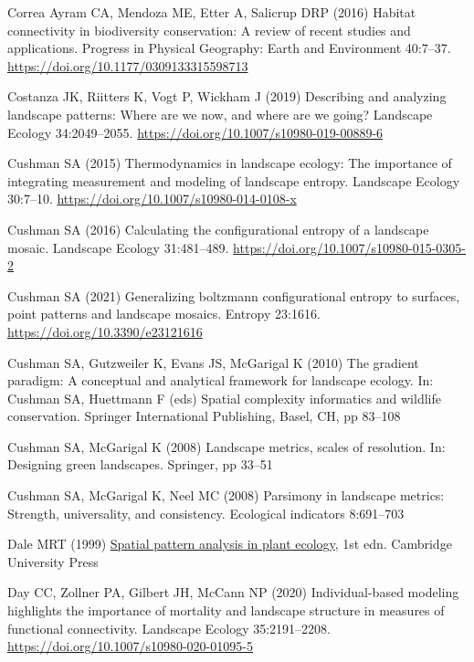 \documentclass[
  10pt,
  a4paperpaper,
]{article}
\newlength{\cslhangindent}
\newenvironment{CSLReferences}[2] %
 {\begin{list}{}{%
  \setlength{\itemindent}{0pt}
  \setlength{\leftmargin}{0pt}
  \setlength{\parsep}{0pt}
  \ifodd #1
   \setlength{\leftmargin}{\cslhangindent}
   \setlength{\itemindent}{-1\cslhangindent}
  \fi
  \setlength{\itemsep}{#2\baselineskip}}}
 {\end{list}}
\begin{document}
\begin{CSLReferences}{1}{1}
Correa Ayram CA, Mendoza ME, Etter A, Salicrup DRP (2016) Habitat
connectivity in biodiversity conservation: A review of recent studies
and applications. Progress in Physical Geography: Earth and Environment
40:7--37. \url{https://doi.org/10.1177/0309133315598713}

Costanza JK, Riitters K, Vogt P, Wickham J (2019) Describing and
analyzing landscape patterns: Where are we now, and where are we going?
Landscape Ecology 34:2049--2055.
\url{https://doi.org/10.1007/s10980-019-00889-6}

Cushman SA (2015) Thermodynamics in landscape ecology: The importance of
integrating measurement and modeling of landscape entropy. Landscape
Ecology 30:7--10. \url{https://doi.org/10.1007/s10980-014-0108-x}

Cushman SA (2016) Calculating the configurational entropy of a landscape
mosaic. Landscape Ecology 31:481--489.
\url{https://doi.org/10.1007/s10980-015-0305-2}

Cushman SA (2021) Generalizing boltzmann configurational entropy to
surfaces, point patterns and landscape mosaics. Entropy 23:1616.
\url{https://doi.org/10.3390/e23121616}

Cushman SA, Gutzweiler K, Evans JS, McGarigal K (2010) The gradient
paradigm: A conceptual and analytical framework for landscape ecology.
In: Cushman SA, Huettmann F (eds) Spatial complexity informatics and
wildlife conservation. Springer International Publishing, Basel, CH, pp
83--108

Cushman SA, McGarigal K (2008) Landscape metrics, scales of resolution.
In: Designing green landscapes. Springer, pp 33--51

Cushman SA, McGarigal K, Neel MC (2008) Parsimony in landscape metrics:
Strength, universality, and consistency. Ecological indicators
8:691--703

Dale MRT (1999) \href{https://doi.org/10.1017/CBO9780511612589}{Spatial
pattern analysis in plant ecology}, 1st edn. Cambridge University Press

Day CC, Zollner PA, Gilbert JH, McCann NP (2020) Individual-based
modeling highlights the importance of mortality and landscape structure
in measures of functional connectivity. Landscape Ecology 35:2191--2208.
\url{https://doi.org/10.1007/s10980-020-01095-5}


\end{CSLReferences}
\end{document}
